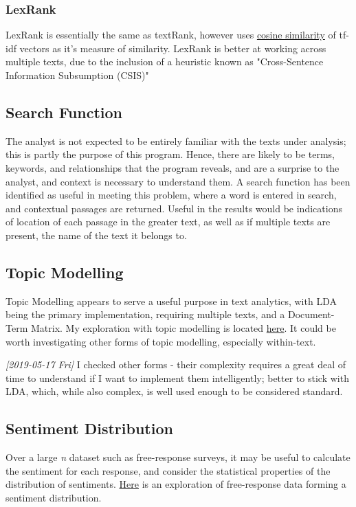 \documentclass[11pt]{article}
\begin{document}
\subsubsection{LexRank}
\label{sec:orgb34038c}
LexRank is essentially the same as textRank, however uses
\href{https://en.wikipedia.org/wiki/Cosine\_similarity}{cosine similarity} of tf-idf vectors as it's measure of similarity. LexRank is better at
working across multiple texts, due to the inclusion of a heuristic known
as "Cross-Sentence Information Subsumption (CSIS)"
\subsection{Search Function}
\label{sec:orgaee944e}
The analyst is not expected to be entirely familiar with the texts
under analysis; this is partly the purpose of this program. Hence,
there are likely to be terms, keywords, and relationships that the
program reveals, and are a surprise to the analyst, and context is
necessary to understand them. A search function has been identified as
useful in meeting this problem, where a word is entered in search, and
contextual passages are returned. Useful in the results would be
indications of location of each passage in the greater text, as well
as if multiple texts are present, the name of the text it belongs to.

\subsection{Topic Modelling}
\label{sec:orga868453}
Topic Modelling appears to serve a useful purpose in text analytics,
with LDA being the primary implementation, requiring multiple texts,
and a Document-Term Matrix. My exploration with topic modelling is
located \href{topic-modelling.Rmd}{here}. It could be worth investigating other forms of topic
modelling, especially within-text.

\textit{[2019-05-17 Fri] } I checked other forms - their complexity requires a
great deal of time to understand if I want to implement them
intelligently; better to stick with LDA, which, while also complex, is
well used enough to be considered standard.
\subsection{Sentiment Distribution}
\label{sec:orgd3cdbd0}
Over a large \emph{n} dataset such as free-response surveys, it may be
useful to calculate the sentiment for each response, and consider the
statistical properties of the distribution of sentiments. \href{sent-dist.org}{Here} is an
exploration of free-response data forming a sentiment distribution.
\end{document}
